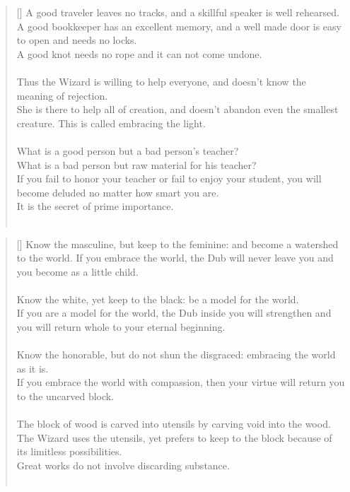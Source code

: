 \documentclass{article}
\begin{document}
\settowidth{\versewidth}{The Wizard leads byemptying people’s minds, filling their bellies, weakening their am- bitions, and making them become strong}
\begin{verse}[\versewidth]
A good traveler leaves no tracks, and a skillful speaker is well rehearsed.\\
A good bookkeeper has an excellent memory, and a well made door is easy to open and needs no locks.\\
A good knot needs no rope and it can not come undone.\\
\hfill\\
Thus the Wizard is willing to help everyone, and doesn't know the meaning of rejection.\\
She is there to help all of creation, and doesn't abandon even the smallest creature. 
This is called embracing the light.\\
\hfill\\
What is a good person but a bad person's teacher?\\
What is a bad person but raw material for his teacher?\\
If you fail to honor your teacher or fail to enjoy your student, you will become deluded no matter how smart you are.\\
It is the secret of prime importance.\\
\hfill\\
\end{verse}

\settowidth{\versewidth}{The Wizard leads byemptying people’s minds, filling their bellies, weakening their am- bitions, and making them become strong}
\begin{verse}[\versewidth]
Know the masculine, but keep to the feminine: and become a watershed to the world. 
If you embrace the world, the Dub will never leave you and you become as a little child.\\
\hfill\\
Know the white, yet keep to the black: be a model for the world.\\
If you are a model for the world, the Dub inside you will strengthen and you will return whole to your eternal beginning.\\
\hfill\\
Know the honorable, but do not shun the disgraced: embracing the world as it is.\\
If you embrace the world with compassion, then your virtue will return you to the uncarved block.\\
\hfill\\
The block of wood is carved into utensils by carving void into the wood.\\
The Wizard uses the utensils, yet prefers to keep to the block because of its limitless possibilities.\\
Great works do not involve discarding substance.\\
\hfill\\
\end{verse}
\end{document}
